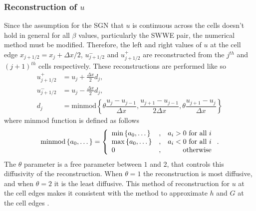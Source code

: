 \documentclass[10pt]{elsarticle}
\begin{document}
\subsubsection{Reconstruction of $u$}
Since the assumption for the SGN that $u$ is continuous across the cells doesn't hold in general for all $\beta$ values, particularly the SWWE pair, the numerical method must be modified. Therefore, the left and right values of $u$ at the cell edge $x_{j+1/2} = x_j + \Delta x /2$,  $u^-_{j+1/2}$ and $u^+_{j+1/2}$  are reconstructed from the $j^{th}$ and $(j+1)^{th}$ cells respectively. These reconstructions are performed like so
\begin{align}
u^+_{j+1/2} &= u_j + \frac{\Delta x}{2} d_j, \\
u^-_{j+1/2} &= u_j - \frac{\Delta x}{2} d_j, \\
d_j &= \text{minmod}\left\lbrace \theta \dfrac{u_{j} - u_{j-1}}{\Delta x}, \dfrac{u_{j+1} - u_{j-1}}{2 \Delta x}, \theta \dfrac{u_{j+1} - u_{j}}{\Delta x} \right \rbrace
\end{align}
where minmod function is defined as follows
\begin{equation}
\text{minmod}\left\lbrace a_0,\dots \right\rbrace = \left \lbrace \begin{array}{l c r}
\min\left\lbrace a_0,\dots \right\rbrace &,& a_i > 0 \text{ for all } i\\
\max\left\lbrace a_0,\dots   \right\rbrace &,& a_i < 0 \text{ for all } i\\
0 &,& \text{otherwise}
\end{array} \right. .
\end{equation}
The $\theta$ parameter is a free parameter between $1$ and $2$, that controls this diffusivity of the reconstruction. When $\theta =1$ the reconstruction is most diffusive, and when $\theta=2$ it is the least diffusive. This method of reconstruction for $u$ at the cell edges makes it consistent with the method to approximate $h$ and $G$ at the cell edges \cite{Zoppou-etal-2017}. 
\end{document}
